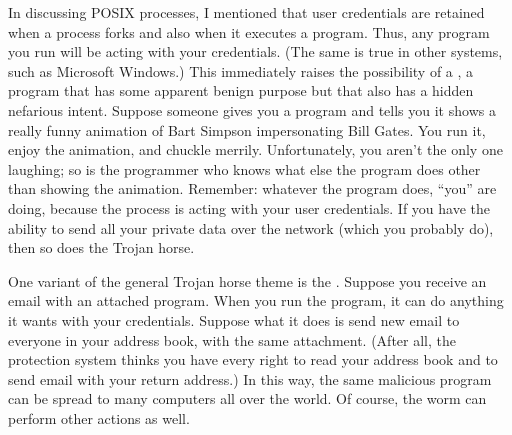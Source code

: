 In discussing POSIX processes, I mentioned that user credentials are
retained when a process forks and also when it executes a program.
Thus, any program you run will be acting with your credentials.  (The
same is true in other systems, such as Microsoft Windows.)  This
immediately raises the possibility of a , a
program that has some apparent benign purpose but that also has a hidden nefarious intent.  Suppose
someone gives you a program and tells you it shows a really funny
animation of Bart Simpson impersonating Bill Gates.  You run it, enjoy
the animation, and chuckle merrily.  Unfortunately, you aren't the
only one laughing; so is the programmer who knows what else the program
does other than showing the animation.  Remember: whatever the program
does, ``you'' are doing, because the process is acting with your user
credentials.  If you have the ability to send all your private
data over the network (which you probably do), then so does the Trojan
horse.

One variant of the general Trojan horse theme is
the .  Suppose you receive an email with an
attached program.  When you run the program, it can do anything it
wants with your credentials.  Suppose what it does is send new email
to everyone in your address book, with the same attachment. (After
all, the protection system thinks you have every right to read your
address book and to send email with your return address.)  In this
way, the same malicious program can be spread to many computers all
over the world.  Of course, the worm can perform other actions as
well.

